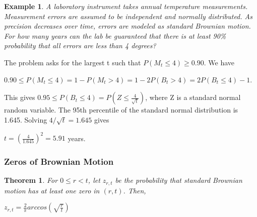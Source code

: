 \documentclass[12pt]{article}
\newtheorem{theorem}{Theorem}
\newtheorem{example}{Example}
\begin{document}
\begin{example}
    A laboratory instrument takes annual temperature measurements. Measurement errors are assumed to be independent and normally distributed. As precision decreases over time, errors are modeled as standard Brownian motion. For how many years can the lab be guaranteed that there is at least 90\% probability that all errors are less than 4 degrees?
\end{example}

\noindent The problem asks for the largest t such that $P(M_t \leq 4) \geq 0.90$. We have
\begin{center}
    $0.90 \leq P(M_t \leq 4) = 1 - P(M_t > 4) = 1 - 2P(B_t > 4) = 2P(B_t \leq 4) - 1$.
\end{center}
This gives $0.95 \leq P(B_t \leq 4) = P(Z \leq \frac{4}{\sqrt{t}})$,
where Z is a standard normal random variable. The 95th percentile of the standard normal distribution is 1.645. Solving $4/\sqrt{t}=1.645$ gives
\begin{center}
    $t = (\frac{4}{1.645})^2 = 5.91$ years.
\end{center}

\subsubsection{Zeros of Brownian Motion}

\begin{theorem}
    For $0 \leq r < t$, let $z_{r,t}$ be the probability that standard Brownian motion has at least one zero in $(r,t)$. Then,
    \begin{center}
        $z_{r,t}=\frac{2}{\pi}arccos(\sqrt{\frac{r}{t}})$
    \end{center}
\end{theorem}
\end{document}
